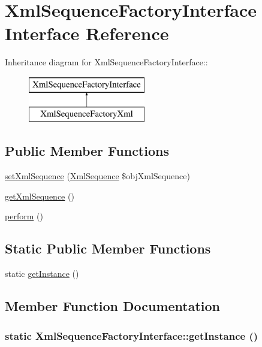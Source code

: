 \hypertarget{interface_xml_sequence_factory_interface}{
\section{XmlSequenceFactoryInterface Interface Reference}
\label{interface_xml_sequence_factory_interface}
}
Inheritance diagram for XmlSequenceFactoryInterface::\begin{figure}[H]
\begin{center}
\leavevmode
\includegraphics[height=2cm]{interface_xml_sequence_factory_interface}
\end{center}
\end{figure}
\subsection*{Public Member Functions}
\begin{CompactItemize}
\item 
\hyperlink{interface_xml_sequence_factory_interface_8fbb97bc3fbf487c357f5a255a3a2357}{setXmlSequence} (\hyperlink{class_xml_sequence}{XmlSequence} \$objXmlSequence)
\item 
\hyperlink{interface_xml_sequence_factory_interface_a6f31a5f6a768055644ddb62d101cbb6}{getXmlSequence} ()
\item 
\hyperlink{interface_xml_sequence_factory_interface_c06f18d6c688317b41477c315f7008f7}{perform} ()
\end{CompactItemize}
\subsection*{Static Public Member Functions}
\begin{CompactItemize}
\item 
static \hyperlink{interface_xml_sequence_factory_interface_5ad765cdd7548f50459910554b46b015}{getInstance} ()
\end{CompactItemize}


\subsection{Member Function Documentation}
\hypertarget{interface_xml_sequence_factory_interface_5ad765cdd7548f50459910554b46b015}{
\subsubsection[{getInstance}]{\setlength{\rightskip}{0pt plus 5cm}static XmlSequenceFactoryInterface::getInstance ()}}
\label{interface_xml_sequence_factory_interface_5ad765cdd7548f50459910554b46b015}


